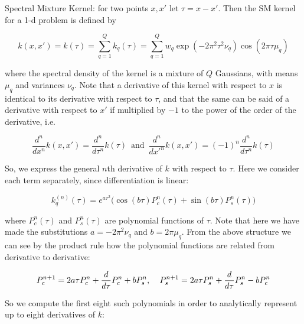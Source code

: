 \documentclass[]{article}
\title{}
\author{}
\begin{document}
\maketitle

Spectral Mixture Kernel: for two points $x,x'$ let $\tau=x-x'$. Then the SM kernel for a 1-d problem is defined by 

\[ k(x,x') = k(\tau) = \sum_{q=1}^Qk_q(\tau) = \sum_{q=1}^Qw_q\exp(-2\pi^2\tau^2\nu_q)\cos(2\pi\tau\mu_q)  \]

where the spectral density of the kernel is a mixture of $Q$ Gaussians, with means $\mu_q$ and variances $\nu_q$. Note that a derivative of this kernel with respect to $x$ is identical to its derivative with respect to $\tau$, and that the same can be said of a derivative with respect to $x'$ if multiplied by $-1$ to the power of the order of the derivative, i.e. 

\[ \frac{d^n}{dx^n}k(x,x')=\frac{d^n}{d\tau^n}k(\tau)\,\text{ and }\, \frac{d^n}{dx'^n}k(x,x')=(-1)^n\frac{d^n}{d\tau^n}k(\tau)  \]

So, we express the general $n$th derivative of $k$ with respect to $\tau$. Here we consider each term separately, since differentiation is linear:

\[ k_q^{(n)}(\tau) = e^{a\tau^2}\big(\cos(b\tau)P_c^n(\tau)+\sin(b\tau)P_s^n(\tau)\big)  \]

where $P_c^n(\tau)$ and $P_s^n(\tau)$ are polynomial functions of $\tau$. Note that here we have made the substitutions $a=-2\pi^2\nu_q$ and $b=2\pi\mu_q$. From the above structure we can see by the product rule how the polynomial functions are related from derivative to derivative:

\[ P_c^{n+1}=2a\tau P_c^n+\frac{d}{d\tau}P_c^n+bP_s^n,\hspace{.15in} P_s^{n+1}=2a\tau P_s^n+\frac{d}{d\tau}P_s^n-bP_c^n  \]

So we compute the first eight such polynomials in order to analytically represent up to eight derivatives of $k$:
\end{document}
